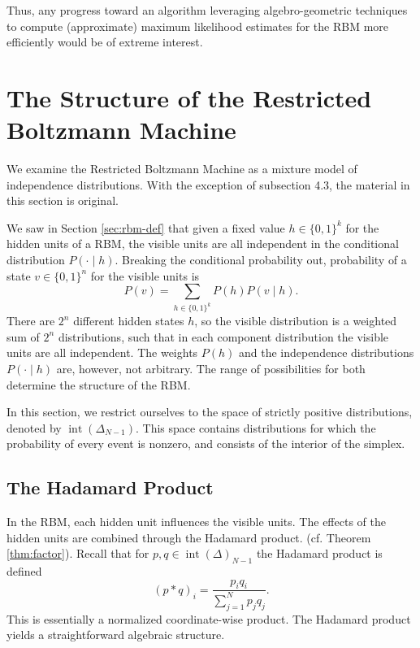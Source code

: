 \documentclass[11pt,titlepage]{article}
\DeclareMathOperator{\intr}{int}
\numberwithin{equation}{section}
\begin{document}
    Thus, any progress toward an algorithm leveraging algebro-geometric
    techniques to compute (approximate) maximum likelihood estimates for the RBM
    more efficiently  would be of extreme interest.


\section{The Structure of the Restricted Boltzmann Machine}

    We examine the Restricted Boltzmann Machine as a mixture model of
    independence distributions.  With the exception of subsection 4.3, the
    material in this section is original.

    We saw in Section \ref{sec:rbm-def} that given a fixed value $h \in
    \{0,1\}^k$ for the hidden units of a RBM, the visible units are all
    independent in the conditional distribution $P( \cdot\mid h )$.  Breaking
    the conditional probability out, probability of a state $v \in \{0,1\}^n$
    for the visible units is
    \[
        P( v ) = \sum_{h \in \{0,1\}^k} P( h ) P( v \mid h ).
    \]
    There are $2^n$ different hidden states $h$, so the visible distribution is
    a weighted sum of $2^n$ distributions, such that in each component
    distribution the visible units are all independent.  The weights $P(h)$ and
    the independence distributions $P(\cdot \mid h)$ are, however, not
    arbitrary.  The range of possibilities for both determine the structure of
    the RBM.

    In this section, we restrict ourselves to the space of strictly positive
    distributions, denoted by $\intr(\Delta_{N-1})$.  This space contains
    distributions for which the probability of every event is nonzero, and
    consists of the interior of the simplex.

\subsection{The Hadamard Product}

    In the RBM, each hidden unit influences the visible units.  The effects of
    the hidden units are combined through the Hadamard product.  (cf. Theorem
    \ref{thm:factor}).  Recall that for $p, q \in \intr(\Delta)_{N-1}$ the
    Hadamard product is defined
    \[
        (p * q)_i = \frac{p_i q_i}{\sum_{j=1}^N p_j q_j}.
    \]
    This is essentially a normalized coordinate-wise product.  The Hadamard
    product yields a straightforward algebraic structure.
\end{document}
